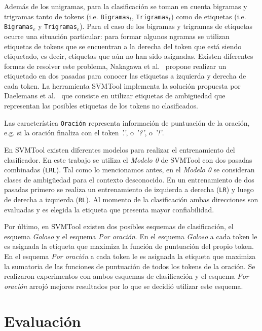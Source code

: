 \documentclass[runningheads,a4paper]{llncs}
\begin{document}
Adem\'as de los unigramas, para la clasificaci\'on se toman en cuenta bigramas y trigramas tanto de tokens (i.e. \texttt{\small Bigramas$_{t}$}, \texttt{\small Trigramas$_{t}$}) como de etiquetas (i.e. \texttt{\small Bigramas$_{e}$} y \texttt{\small Trigramas$_{e}$}). Para el caso de los bigramas y trigramas de etiquetas ocurre una situaci\'on particular: para formar algunos ngramas se utilizan etiquetas de tokens que se encuentran a la derecha del token que está siendo etiquetado, es decir, etiquetas que aún no han sido asignadas. Existen diferentes formas de resolver este problema, Nakagawa et al.~\cite{NAKAGAWA01} propone realizar un etiquetado en dos pasadas para conocer las etiquetas a izquierda y derecha de cada token. La herramienta SVMTool implementa la solución propuesta por \hbox{Daelemans} et al.~\cite{DAELEMANS96} que consiste en utilizar etiquetas de ambig\"uedad que representan las posibles etiquetas de los tokens no clasificados.

Las caracter\'istica \texttt{\small Oraci\'on} representa información de puntuación de la oración, e.g. si la oración finaliza con el token \emph{'.'}, o \emph{'?'}, o \emph{'!'}.

En SVMTool existen diferentes modelos para realizar el entrenamiento del clasificador. En este trabajo se utiliza el \emph{Modelo 0} de SVMTool con dos pasadas combinadas (\texttt{\small LRL}). Tal como lo mencionamos antes, en el \emph{Modelo 0} se consideran clases de ambig\"uedad para el contexto desconocido. En un entrenamiento de dos pasadas primero se realiza un entrenamiento de izquierda a derecha (\texttt{\small LR}) y luego de derecha a izquierda (\texttt{\small RL}). Al momento de la clasificación ambas direcciones son evaluadas y es elegida la etiqueta que presenta mayor confiabilidad.

Por último, en SVMTool existen dos posibles esquemas de clasificación, el esquema \emph{Goloso} y el esquema \emph{Por oración}. En el esquema \emph{Goloso} a cada token le es asignada la etiqueta que maximiza la función de puntuación del propio token. En el esquema \emph{Por oración} a cada token le es asignada la etiqueta que maximiza la sumatoria de las funciones de puntuación de todos los tokens de la oración. Se realizaron experimentos con ambos esquemas de clasificación y el esquema \emph{Por oración} arrojó mejores resultados por lo que se decidió utilizar este esquema.

\section{Evaluación}
\label{sec:Resultados}
\end{document}

